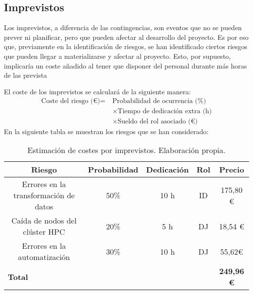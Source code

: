 \subsection{Imprevistos}

Los imprevistos, a diferencia de las contingencias, son eventos que no se pueden prever ni planificar, pero que pueden afectar al desarrollo del proyecto.
Es por eso que, previamente en la identificación de riesgos, se han identificado ciertos riesgos que pueden llegar a materializarse y afectar al proyecto.
Esto, por supuesto, implicaría un coste añadido al tener que disponer del
personal durante más horas de las prevista

El coste de los imprevistos se calculará de la siguiente manera:
\begin{align}
    \text{Coste del riesgo (€)} =\ & \text{Probabilidad de ocurrencia (\%)} \nonumber \\
    & \times \text{Tiempo de dedicación extra (h)} \nonumber \\
    & \times \text{Sueldo del rol asociado (€)}
\end{align}
En la siguiente tabla se muestran los riesgos que se han considerado:
\begin{table}[h!]
    \centering
    \begin{tabular}{|c|c|c|c|c|}
        \hline
        \textbf{Riesgo} & \textbf{Probabilidad} & \textbf{Dedicación} & \textbf{Rol} & \textbf{Precio}\\
        \hline
        Errores en la transformación de datos & 50\% & 10 h & ID & 175,80 € \\
        Caída de nodos del clúster HPC & 20\% & 5 h & DJ & 18,54 € \\
        Errores en la automatización & 30\% & 10 h &  DJ & 55,62€\\
        \hline
        \multicolumn{4}{|l|}{\textbf{Total}}  & \textbf{249,96 €} \\
        \hline
    \end{tabular}
    \caption{Estimación de costes por imprevistos. Elaboración propia.}
    \label{tab:coste_imprevistos}
\end{table}
